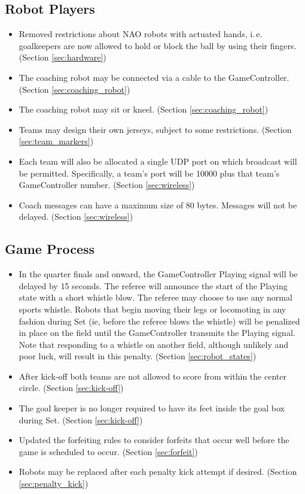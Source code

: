 \documentclass[12pt]{article}
\newcommand{\ie}{\mbox{i.\,e.}\xspace}
\begin{document}
\subsection*{Robot Players}
\begin{itemize}
	\item Removed restrictions about NAO robots with actuated hands, \ie goalkeepers are now allowed to hold or block the ball by using their fingers. (Section \ref{sec:hardware})
	\item The coaching robot may be connected via a cable to the GameController. (Section \ref{sec:coaching_robot})
	\item The coaching robot may sit or kneel. (Section \ref{sec:coaching_robot})
	\item Teams may design their own jerseys, subject to some restrictions. (Section \ref{sec:team_markers})
	\item Each team will also be allocated a single UDP port on which broadcast will be permitted.  Specifically, a team's port will be 10000 plus that team's GameController number. (Section \ref{sec:wireless})
	\item Coach messages can have a maximum size of 80 bytes.  Messages will not be delayed. (Section \ref{sec:wireless})
\end{itemize}

\subsection*{Game Process}
\begin{itemize}
	\item In the quarter finals and onward, the GameController Playing signal will be delayed by 15 seconds.  The referee will announce the start of the Playing state with a short whistle blow.  The referee may choose to use any normal sports whistle.  Robots that begin moving their legs or locomoting in any fashion during Set (ie, before the referee blows the whistle) will be penalized in place on the field until the GameController transmits the Playing signal.  Note that responding to a whistle on another field, although unlikely and poor luck, will result in this penalty. (Section \ref{sec:robot_states})
	\item After kick-off both teams are not allowed to score from within the center circle. (Section \ref{sec:kick-off})
	\item The goal keeper is no longer required to have its feet inside the goal box during Set. (Section \ref{sec:kick-off})
	\item Updated the forfeiting rules to consider forfeits that occur well before the game is scheduled to occur. (Section \ref{sec:forfeit})
	\item Robots may be replaced after each penalty kick attempt if desired. (Section \ref{sec:penalty_kick})
\end{itemize}
\end{document}
